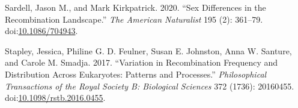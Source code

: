 \documentclass[]{article}
\begin{document}
\hypertarget{ref-sardell_sex_2020}{}
Sardell, Jason M., and Mark Kirkpatrick. 2020. ``Sex Differences in the
Recombination Landscape.'' \emph{The American Naturalist} 195 (2):
361--79. doi:\href{https://doi.org/10.1086/704943}{10.1086/704943}.

\hypertarget{ref-stapley_variation_2017}{}
Stapley, Jessica, Philine G. D. Feulner, Susan E. Johnston, Anna W.
Santure, and Carole M. Smadja. 2017. ``Variation in Recombination
Frequency and Distribution Across Eukaryotes: Patterns and Processes.''
\emph{Philosophical Transactions of the Royal Society B: Biological
Sciences} 372 (1736): 20160455.
doi:\href{https://doi.org/10.1098/rstb.2016.0455}{10.1098/rstb.2016.0455}.
\end{document}
